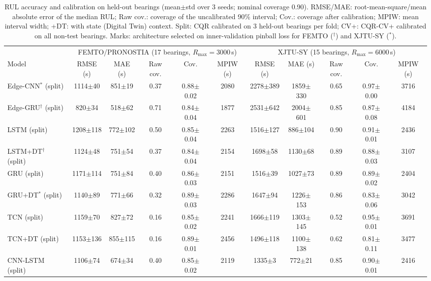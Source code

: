 \begin{table}[t]
\centering
\caption{RUL accuracy and calibration on held-out bearings (mean$\pm$std over 3 seeds; nominal coverage 0.90). RMSE/MAE: root-mean-square/mean absolute error of the median RUL; Raw cov.: coverage of the uncalibrated 90\% interval; Cov.: coverage after calibration; MPIW: mean interval width; +DT: with state (Digital Twin) context. Split: CQR calibrated on 3 held-out bearings per fold; CV+: CQR-CV+ calibrated on all non-test bearings. Marks: architecture selected on inner-validation pinball loss for FEMTO ($^\dagger$) and XJTU-SY ($^\ast$).}
\label{tab:rul}
\setlength{\tabcolsep}{3.2pt}\footnotesize
\begin{tabular}{l|ccccc|ccccc}
\toprule
 & \multicolumn{5}{c|}{FEMTO/PRONOSTIA (17 bearings, $R_{\max}{=}3000$\,s)} & \multicolumn{5}{c}{XJTU-SY (15 bearings, $R_{\max}{=}6000$\,s)} \\
Model & RMSE (s) & MAE (s) & Raw cov. & Cov. & MPIW (s) & RMSE (s) & MAE (s) & Raw cov. & Cov. & MPIW (s) \\
\midrule
Edge-CNN$^\ast$ (split) & 1114$\pm$40 & 851$\pm$19 & 0.37 & 0.88$\pm$0.02 & 2080 & 2278$\pm$389 & 1859$\pm$330 & 0.65 & 0.97$\pm$0.00 & 3716 \\
Edge-GRU$^\dagger$ (split) & 820$\pm$34 & 518$\pm$62 & 0.71 & 0.84$\pm$0.04 & 1877 & 2531$\pm$642 & 2004$\pm$601 & 0.85 & 0.87$\pm$0.08 & 4184 \\
\midrule
LSTM (split) & 1208$\pm$118 & 772$\pm$102 & 0.50 & 0.85$\pm$0.04 & 2263 & 1516$\pm$127 & 886$\pm$104 & 0.90 & 0.91$\pm$0.01 & 2436 \\
LSTM+DT$^\dagger$ (split) & 1124$\pm$48 & 751$\pm$54 & 0.37 & 0.84$\pm$0.04 & 2154 & 1698$\pm$58 & 1130$\pm$68 & 0.89 & 0.88$\pm$0.03 & 3107 \\
GRU (split) & 1171$\pm$114 & 751$\pm$84 & 0.40 & 0.86$\pm$0.03 & 2151 & 1516$\pm$39 & 1027$\pm$73 & 0.89 & 0.89$\pm$0.02 & 2404 \\
GRU+DT$^\ast$ (split) & 1140$\pm$89 & 771$\pm$66 & 0.32 & 0.89$\pm$0.03 & 2286 & 1647$\pm$94 & 1226$\pm$153 & 0.86 & 0.83$\pm$0.06 & 3042 \\
TCN (split) & 1159$\pm$70 & 827$\pm$72 & 0.16 & 0.85$\pm$0.02 & 2241 & 1666$\pm$119 & 1303$\pm$145 & 0.52 & 0.95$\pm$0.01 & 3691 \\
TCN+DT (split) & 1153$\pm$136 & 855$\pm$115 & 0.16 & 0.89$\pm$0.01 & 2456 & 1496$\pm$118 & 1100$\pm$138 & 0.62 & 0.81$\pm$0.11 & 3477 \\
CNN-LSTM (split) & 1106$\pm$74 & 674$\pm$34 & 0.40 & 0.85$\pm$0.02 & 2119 & 1335$\pm$3 & 772$\pm$21 & 0.85 & 0.90$\pm$0.01 & 2416 \\

\end{tabular}
\end{table}
